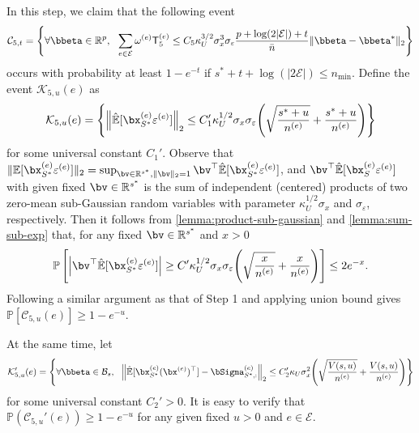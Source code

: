 \documentclass[10pt]{article}
\numberwithin{equation}{section}
\begin{document}
 In this step, we claim that the following event
\begin{align}
\label{eq:low-dim-id-bound5}
    \mathcal{C}_{5,t} = \left\{\forall \bbeta \in \mathbb{R}^p, ~~ \sum_{e\in \mathcal{E}} \omega^{(e)} \mathsf{T}_5^{(e)} \le C_5\kappa_U^{3/2} \sigma_x^3 \sigma_\varepsilon \frac{p + \log(2|\mathcal{E}|)+t}{\bar{n}}\|\bbeta - \bbeta^*\|_2\right\}
\end{align} occurs with probability at least $1-e^{-t}$ if $s^*+t+\log(|2\mathcal{E}|) \le n_{\min}$. Define the event $\mathcal{K}_{5,u}(e)$ as
\begin{align*}
    \mathcal{K}_{5,u}(e) = \left\{\left\|\hat{\mathbb{E}}[\bx_{S^*}^{(e)}\varepsilon^{(e)}]\right\|_2 \le C_{1}'\kappa_U^{1/2} \sigma_x \sigma_\varepsilon \Bigg(\sqrt{\frac{s^* + u}{n^{(e)}}} + \frac{s^* + u}{n^{(e)}}\Bigg)\right\}
\end{align*} for some universal constant $C_1'$. Observe that $\|\mathbb{E}[\bx_{S^*}^{(e)}\varepsilon^{(e)}]\|_2 = \sup_{\bv\in \mathbb{R}^{s^*}, \|\bv\|_2=1} \bv^\top \hat{\mathbb{E}}[\bx_{S^*}^{(e)}\varepsilon^{(e)}]$,
and $\bv^\top \hat{\mathbb{E}}[\bx_S^{(e)}\varepsilon^{(e)}]$ with given fixed $\bv\in \mathbb{R}^{s^*}$ is the sum of independent (centered) products of two zero-mean sub-Gaussian random variables with parameter $\kappa_U^{1/2} \sigma_x$ and $\sigma_\varepsilon$, respectively. Then it follows from \cref{lemma:product-sub-gaussian} and \cref{lemma:sum-sub-exp} that, for any fixed $\bv\in \mathbb{R}^{s^*}$ and $x>0$
\begin{align*}
    \mathbb{P}\left[ \left|\bv^\top \hat{\mathbb{E}}[\bx_{S^*}^{(e)}\varepsilon^{(e)}] \right| \ge C'\kappa_U^{1/2}\sigma_x \sigma_\varepsilon\Bigg(\sqrt{\frac{x}{n^{(e)}}} + \frac{x}{n^{(e)}}\Bigg)\right] \le 2e^{-x}.
\end{align*} Following a similar argument as that of {\sc Step 1} and applying union bound gives $\mathbb{P}\left[\mathcal{C}_{5,u}(e)\right] \ge 1-e^{-u}$. 

At the same time, let 
\begin{align*}
    \mathcal{K}_{5,u}'(e) = \left\{ \forall \bbeta \in \mathcal{B}_s, ~~ \left\| \hat{\mathbb{E}}[\bx_{S^*}^{(e)} (\bx^{(e)})^\top] - \bSigma^{(e)}_{S^*,:} \right\|_2 \le C_2'\kappa_U \sigma_x^2 \Bigg(\sqrt{\frac{V(s,u)}{n^{(e)}}} + \frac{V(s,u)}{n^{(e)}}\Bigg)\right\}
\end{align*} for some universal constant $C_2'>0$. It is easy to verify that $\mathbb{P}(\mathcal{C}_{5,u}'(e)) \ge 1-e^{-u}$ for any given fixed $u>0$ and $e\in \mathcal{E}$. 
\end{document}
